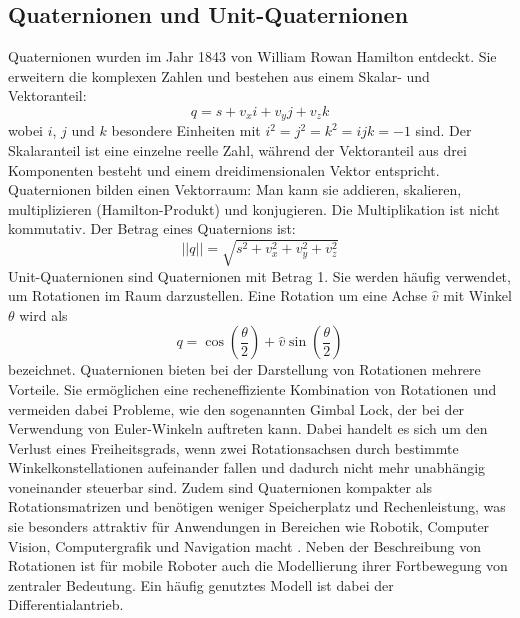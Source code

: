 \subsection{Quaternionen und Unit-Quaternionen}
Quaternionen wurden im Jahr 1843 von William Rowan Hamilton entdeckt. Sie erweitern die komplexen Zahlen und bestehen aus einem Skalar- und Vektoranteil:
 \[
 q=s+v_xi+v_yj+v_zk
 \]
 wobei $i$, $j$ und $k$ besondere Einheiten mit $i^2=j^2=k^2=ijk=-1$ sind.
 Der Skalaranteil ist eine einzelne reelle Zahl, während der Vektoranteil aus drei Komponenten besteht und einem dreidimensionalen Vektor entspricht.
 Quaternionen bilden einen Vektorraum: Man kann sie addieren, skalieren, multiplizieren (Hamilton-Produkt) und konjugieren. Die Multiplikation ist nicht kommutativ. Der Betrag eines Quaternions ist:
 \[
 ||q||=\sqrt{s^2+v_x^2+v_y^2+v_z^2}
 \]
 Unit-Quaternionen sind Quaternionen mit Betrag 1. Sie werden häufig verwendet, um Rotationen im Raum darzustellen. Eine Rotation um eine Achse $\hat{v}$ mit Winkel $\theta$ wird als
 \[
 q=\cos(\frac{\theta}{2})+\hat{v} \sin(\frac{\theta}{2})
 \]
bezeichnet. Quaternionen bieten bei der Darstellung von Rotationen mehrere Vorteile.
 Sie ermöglichen eine recheneffiziente Kombination von Rotationen und vermeiden dabei Probleme, wie den sogenannten Gimbal Lock,
 der bei der Verwendung von Euler-Winkeln auftreten kann.
 Dabei handelt es sich um den Verlust eines Freiheitsgrads,
 wenn zwei Rotationsachsen durch bestimmte Winkelkonstellationen aufeinander fallen und dadurch nicht mehr unabhängig voneinander steuerbar sind.
 Zudem sind Quaternionen kompakter als Rotationsmatrizen und benötigen weniger Speicherplatz und Rechenleistung,
 was sie besonders attraktiv für Anwendungen in Bereichen wie Robotik, Computer Vision, Computergrafik und Navigation macht .
 Neben der Beschreibung von Rotationen ist für mobile Roboter auch die Modellierung ihrer Fortbewegung von zentraler Bedeutung.
 Ein häufig genutztes Modell ist dabei der Differentialantrieb.

